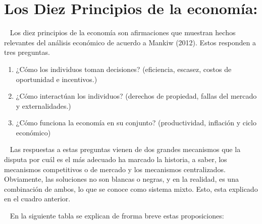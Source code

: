 \documentclass[
  letterpaper,
  DIV=11,
  numbers=noendperiod]{scrreport}
\providecommand{\tightlist}{%
  \setlength{\itemsep}{0pt}\setlength{\parskip}{0pt}}\usepackage{longtable,booktabs,array}
\begin{document}
\hypertarget{los-diez-principios-de-la-economuxeda}{%
\section{Los Diez Principios de la
economía:}\label{los-diez-principios-de-la-economuxeda}}

~ Los diez principios de la economía son afirmaciones que muestran
hechos relevantes del análisis económico de acuerdo a Mankiw (2012).
Estos responden a tres preguntas.

\begin{enumerate}
\def\labelenumi{\arabic{enumi}.}
\tightlist
\item
  ¿Cómo los individuos toman decisiones? (eficiencia, escasez, costos de
  oportunidad e incentivos.)
\item
  ¿Cómo interactúan los individuos? (derechos de propiedad, fallas del
  mercado y externalidades.)
\item
  ¿Cómo funciona la economía en su conjunto? (productividad, inflación y
  ciclo económico)
\end{enumerate}

~ Las respuestas a estas preguntas vienen de dos grandes mecanismos que
la disputa por cuál es el más adecuado ha marcado la historia, a saber,
los mecanismos competitivos o de mercado y los mecanismos centralizados.
Obviamente, las soluciones no son blancas o negras, y en la realidad, es
una combinación de ambos, lo que se conoce como sistema mixto. Esto,
esta explicado en el cuadro anterior.

~ En la siguiente tabla se explican de frorma breve estas proposiciones:
\end{document}
